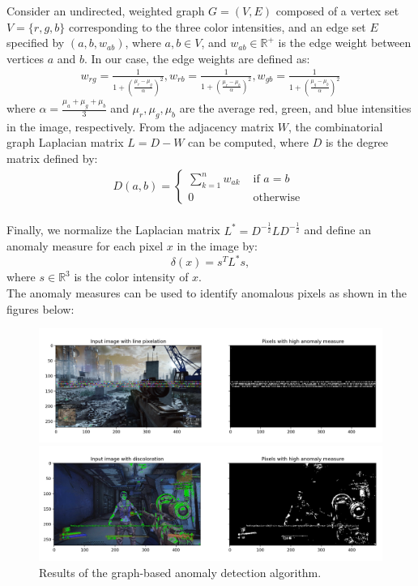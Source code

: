 \noindent Consider an undirected, weighted graph $G = (V,E)$ composed of a vertex set $V =\{r,g,b\}$ corresponding to the three color intensities, and an edge set $E$ specified by $(a, b, w_{ab})$, where $a, b \in V$, and $w_{ab} \in \mathbb{R}^{+}$ is the edge weight between vertices $a$ and $b$.  In our case, the edge weights are defined as:
\begin{align}
w_{rg}=\frac{1}{1+\left(\frac{\mu_{r}-\mu_{g}}{\alpha}\right)^{2}}, w_{rb}=\frac{1}{1+\left(\frac{\mu_{r}-\mu_{b}}{\alpha}\right)^{2}}, w_{gb}=\frac{1}{1+\left(\frac{\mu_{g}-\mu_{b}}{\alpha}\right)^{2}}
\end{align}
\noindent where $\alpha = \frac{\mu_a + \mu_g + \mu_b}{3}$ and $\mu_r, \mu_g, \mu_b$ are the average red, green, and blue intensities in the image, respectively. From the adjacency matrix $W$, the combinatorial graph Laplacian matrix
$L = D - W$ can be computed, where $D$ is the degree matrix defined by:
\begin{align}
D(a, b)=\left\{\begin{array}{ll}{\sum_{k=1}^{n} w_{a k}} & {\text { if } a=b} \\ {0} & {\text { otherwise }}\end{array}\right.
\end{align}\hspace{\fill}\\
\noindent Finally, we normalize the Laplacian matrix $
L^{*}=D^{-\frac{1}{2}}L D^{-\frac{1}{2}}
$ and define an anomaly measure for each pixel $x$ in the image by:
$$ \delta(x) = s^T L^* s,$$
 \noindent where $s \in \mathbb{R}^3$ is the color intensity of $x$.\\





\noindent The anomaly measures can be used to identify anomalous pixels as shown in the figures below:

\begin{figure}[H]
    \centering
    \includegraphics[scale=0.5]{images/graph_laplacian_1.png}
    
    
    \includegraphics[scale=0.5]{images/graph_laplacian_2.png}
    \caption{Results of the graph-based anomaly detection algorithm.}
    \label{fig:graphlaplacian}
\end{figure}



